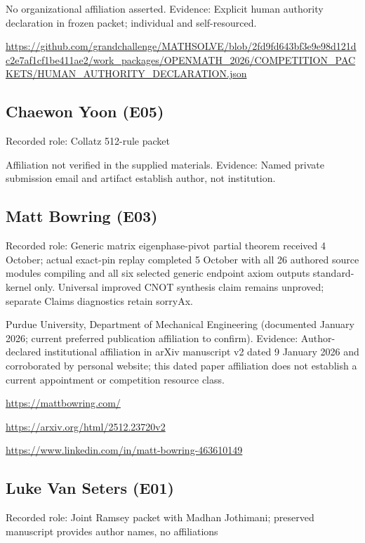 \documentclass[11pt,a4paper]{article}
\begin{document}
No organizational affiliation asserted. Evidence: Explicit human authority declaration in frozen packet; individual and self-resourced.

{\small \url{https://github.com/grandchallenge/MATHSOLVE/blob/2fd9fd643bf3e9e98d121dc2e7af1cf1be411ae2/work_packages/OPENMATH_2026/COMPETITION_PACKETS/HUMAN_AUTHORITY_DECLARATION.json}\par}

\subsection{Chaewon Yoon (E05)}
Recorded role: Collatz 512-rule packet

Affiliation not verified in the supplied materials. Evidence: Named private submission email and artifact establish author, not institution.

\subsection{Matt Bowring (E03)}
Recorded role: Generic matrix eigenphase-pivot partial theorem received 4 October; actual exact-pin replay completed 5 October with all 26 authored source modules compiling and all six selected generic endpoint axiom outputs standard-kernel only. Universal improved CNOT synthesis claim remains unproved; separate Claims diagnostics retain sorryAx.

Purdue University, Department of Mechanical Engineering (documented January 2026; current preferred publication affiliation to confirm). Evidence: Author-declared institutional affiliation in arXiv manuscript v2 dated 9 January 2026 and corroborated by personal website; this dated paper affiliation does not establish a current appointment or competition resource class.

{\small \url{https://mattbowring.com/}\par}

{\small \url{https://arxiv.org/html/2512.23720v2}\par}

{\small \url{https://www.linkedin.com/in/matt-bowring-463610149}\par}

\subsection{Luke Van Seters (E01)}
Recorded role: Joint Ramsey packet with Madhan Jothimani; preserved manuscript provides author names, no affiliations
\end{document}
